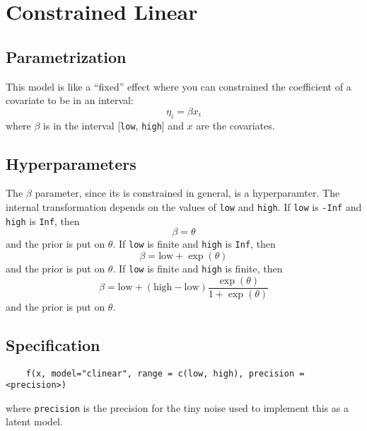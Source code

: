 \documentclass[a4paper,11pt]{article}
\begin{document}
\section*{Constrained Linear}

\subsection*{Parametrization}

This model is like a ``fixed'' effect where you can constrained the
coefficient of a covariate to be in an interval:
\begin{displaymath}
    \eta_{i} = \beta x_{i}
\end{displaymath}
where $\beta$ is in the interval $[$\texttt{low}, \texttt{high}$]$ and $x$
are the covariates.

\subsection*{Hyperparameters}

The $\beta$ parameter, since its is constrained in general, is a
hyperparamter. The internal transformation depends on the values of
\texttt{low} and \texttt{high}. If \texttt{low} is \texttt{-Inf} and
\texttt{high} is \texttt{Inf}, then
\begin{displaymath}
    \beta = \theta
\end{displaymath}
and the prior is put on $\theta$.  If \texttt{low} is finite and
\texttt{high} is \texttt{Inf}, then
\begin{displaymath}
    \beta = \text{low} + \exp(\theta)
\end{displaymath}
and the prior is put on $\theta$. If \texttt{low} is finite and
\texttt{high} is finite, then
\begin{displaymath}
    \beta = \text{low} + (\text{high}-\text{low})\frac{\exp(\theta)}{1+\exp(\theta)}
\end{displaymath}
and the prior is put on $\theta$. 


\subsection*{Specification}

\begin{verbatim}
    f(x, model="clinear", range = c(low, high), precision = <precision>)
\end{verbatim}
where \texttt{precision} is the precision for the tiny noise used to
implement this as a latent model. 
\end{document}
